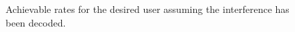 \documentclass[conference]{IEEEtran}
\begin{document}



\begin{figure}
\centering
\setlength\figureheight{4.5cm}
\setlength\figurewidth{7cm}

\caption{Achievable rates for the desired user assuming the interference has been decoded.}	
\label{Fig:ShapingLoss}	
\end{figure}



\end{document}
